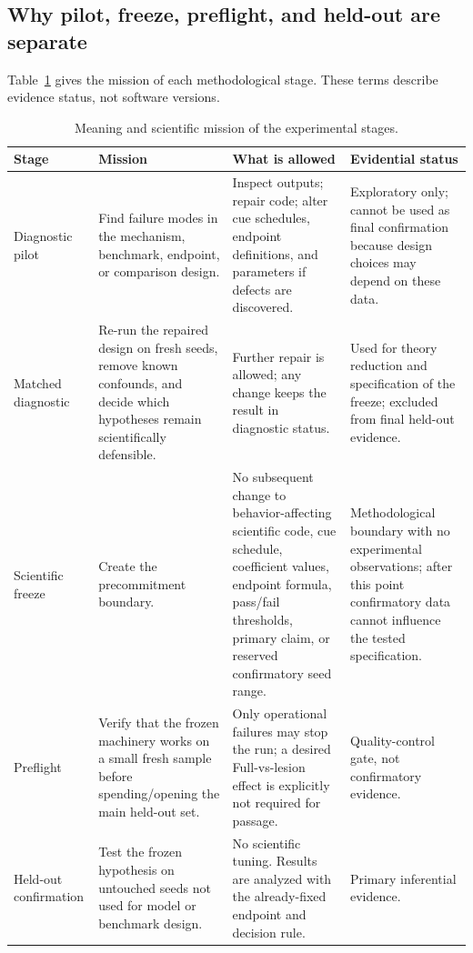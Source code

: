 \documentclass[journal]{IEEEtran}
\begin{document}
\subsection{Why pilot, freeze, preflight, and held-out are separate}
Table~\ref{tab:stages} gives the mission of each methodological stage. These terms describe evidence status, not software versions.

\begin{table}[t]
\caption{Meaning and scientific mission of the experimental stages.}
\label{tab:stages}
\centering
\footnotesize
\begin{tabularx}{\textwidth}{@{}p{}p{}p{}X@{}}
\toprule
Stage & Mission & What is allowed & Evidential status \\
\midrule
Diagnostic pilot & Find failure modes in the mechanism, benchmark, endpoint, or comparison design. & Inspect outputs; repair code; alter cue schedules, endpoint definitions, and parameters if defects are discovered. & Exploratory only; cannot be used as final confirmation because design choices may depend on these data. \\
Matched diagnostic & Re-run the repaired design on fresh seeds, remove known confounds, and decide which hypotheses remain scientifically defensible. & Further repair is allowed; any change keeps the result in diagnostic status. & Used for theory reduction and specification of the freeze; excluded from final held-out evidence. \\
Scientific freeze & Create the precommitment boundary. & No subsequent change to behavior-affecting scientific code, cue schedule, coefficient values, endpoint formula, pass/fail thresholds, primary claim, or reserved confirmatory seed range. & Methodological boundary with no experimental observations; after this point confirmatory data cannot influence the tested specification. \\
Preflight & Verify that the frozen machinery works on a small fresh sample before spending/opening the main held-out set. & Only operational failures may stop the run; a desired Full-vs-lesion effect is explicitly not required for passage. & Quality-control gate, not confirmatory evidence. \\
Held-out confirmation & Test the frozen hypothesis on untouched seeds not used for model or benchmark design. & No scientific tuning. Results are analyzed with the already-fixed endpoint and decision rule. & Primary inferential evidence. \\
\bottomrule
\end{tabularx}
\end{table}
\end{document}
